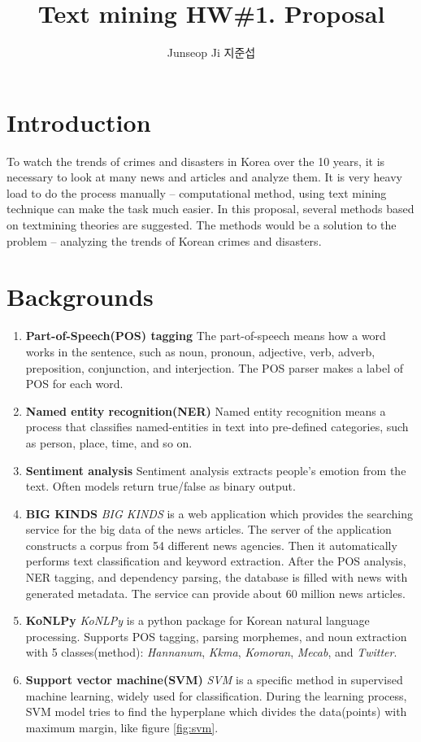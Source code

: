 \documentclass{article}
\author{Junseop Ji 지준섭}
\title{Text mining HW\#1. Proposal}
\begin{document}
\maketitle

\section{Introduction}

To watch the trends of crimes and disasters in Korea over the 10 years,
it is necessary to look at many news and articles and analyze them.
It is very heavy load to do the process manually -- computational method,
using text mining technique can make the task much easier.
In this proposal, several methods based on textmining theories are suggested.
The methods would be a solution to the problem --
analyzing the trends of Korean crimes and disasters.

\section{Backgrounds}

\begin{enumerate}
  \item \textbf{Part-of-Speech(POS) tagging}
  The part-of-speech means how a word works in the sentence, such as
  noun, pronoun, adjective, verb, adverb, preposition, conjunction, and interjection.
  The POS parser makes a label of POS for each word.
  \item \textbf{Named entity recognition(NER)}
  Named entity recognition means a process that classifies
  named-entities in text into pre-defined categories,
  such as person, place, time, and so on.
  \item \textbf{Sentiment analysis}
  Sentiment analysis extracts people's emotion from the text.
  Often models return true/false as binary output. 
  \item \textbf{BIG KINDS}
  \textit{BIG KINDS}\cite{bigkinds} is a web application
  which provides the searching service for the big data of the news articles.
  The server of the application constructs a corpus from 54 different news agencies.
  Then it automatically performs text classification and keyword extraction.
  After the POS analysis, NER tagging, and dependency parsing,
  the database is filled with news with generated metadata.
  The service can provide about 60 million news articles.
  \item \textbf{KoNLPy}
  \textit{KoNLPy}\cite{park2014konlpy} is a python package
  for Korean natural language processing.
  Supports POS tagging, parsing morphemes, and noun extraction with 5 classes(method):
  \textit{Hannanum}, \textit{Kkma}, \textit{Komoran}, \textit{Mecab},
  and \textit{Twitter}.
  \item \textbf{Support vector machine(SVM)}
  \textit{SVM} is a specific method in supervised machine learning,
  widely used for classification.
  During the learning process, SVM model tries to find the hyperplane
  which divides the data(points) with maximum margin, like figure \ref{fig:svm}.
\end{enumerate}
\end{document}
